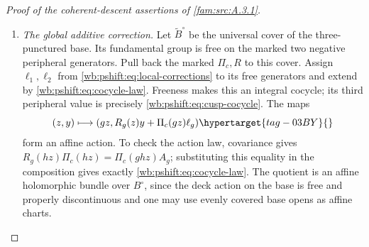 \begin{proof}[Proof of the coherent-descent assertions of \cref{fam:src:A.3.1}]
\begin{enumerate}[label=\arabic*.,leftmargin=*]
The affine cocycle convention in \eqref{wb:pshift:eq:local-affine-cocycle} has multiplication law
\begin{equation}
                    \ell_{gh}=\ell_g+A_g\ell_h.
 \hypertarget{tag-03C0}{}\label{wb:pshift:eq:cocycle-law}
\end{equation}
Since $g_0=(g_1g_2)^{-1}$, it gives
\begin{equation}
\begin{aligned}
 \ell_1+A_1\ell_2
   &=-\frac{3n}{2}\widehat w+\frac n2\widehat\delta,\\
 \ell_0=-A_{g_0}(\ell_1+A_1\ell_2)
   &=\frac{3n}{2}\widehat w-\frac n2\widehat\delta.
\end{aligned}
\hypertarget{tag-03C4}{}\label{wb:pshift:eq:cusp-cocycle}
\end{equation}
Here $A_{g_0}$ fixes both toric lattice vectors, as is also immediate
from $A_{g_0}=\left(\begin{smallmatrix}I&0\\B_0&I\end{smallmatrix}\right)$.
Put
\begin{equation}
 q_n=(-3n/2,n/2)^{\mathsf t}\in\mathbb Z^2,
                  \qquad a_0(z)=s(z)q_n.
 \hypertarget{tag-03C6}{}\label{wb:pshift:eq:cusp-translation}
\end{equation}
Then $a_0(g_0z)-a_0(z)=-q_n=\Pi_c(g_0z)\ell_0$, exactly as
required by \eqref{wb:pshift:eq:local-affine-cocycle}. Exponentiating gives the map
$(x,t_c)\mapsto(t_c^{q_n}x,t_c)$ on the dense cusp torus.
It extends holomorphically and invertibly to the marked infinite fan:
the integral map
\[
 (y,y_3)\longmapsto(y+y_3q_n,y_3)
\]
translates each height-one triangle by the integer vector $q_n$ and
therefore permutes the cones, with inverse given by $-q_n$.
It commutes with the cusp quotient action in \eqref{wb:pshift:eq:cusp-actions-identical}. This proves extension across every cusp stratum.
\item \emph{The global additive correction.}
Let $\widetilde B^\circ$ be
the universal cover of the three-punctured base. Its fundamental group
is free on the marked two negative peripheral generators. Pull back
the marked $\Pi_c,R$ to this cover. Assign $\ell_1,\ell_2$ from
\eqref{wb:pshift:eq:local-corrections} to its free generators and extend by \eqref{wb:pshift:eq:cocycle-law}. Freeness makes
this an integral cocycle; its third peripheral value is
precisely \eqref{wb:pshift:eq:cusp-cocycle}. The maps
\begin{equation}
 (z,y)\longmapsto
       (gz,R_g(z)y+\Pi_c(gz)\ell_g)
 \hypertarget{tag-03BY}{}\label{wb:pshift:eq:affine-bundle-action}
\end{equation}
form an affine action. To check the action law, covariance gives
$R_g(hz)\Pi_c(hz)=\Pi_c(ghz)A_g$; substituting this equality
in the composition gives exactly \eqref{wb:pshift:eq:cocycle-law}.
The quotient is an affine holomorphic bundle over $B^\circ$, since
the deck action on the base is free and properly discontinuous and
one may use evenly covered base opens as affine charts.


\end{enumerate}
\end{proof}

